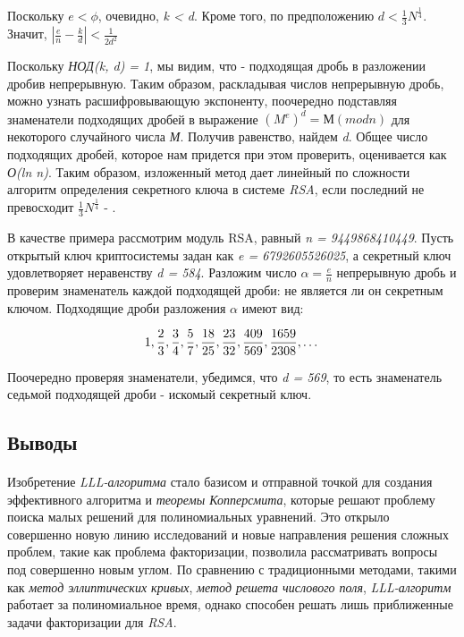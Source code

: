   Поскольку \textit{{$e < \phi$}}, очевидно, \textit{k < d}. Кроме того, по предположению \textit{{$d < \frac{1}{3} N^\frac{1}{4} $}}. Значит, 
  \textit{{$ |\frac{e}{n} - \frac{k}{d}| < \frac{1}{2 d^2} $}}
  
  Поскольку \textit{НОД(k, d) = 1}, мы видим, что - подходящая дробь в разложении дробив непрерывную. Таким образом, раскладывая числов непрерывную дробь, можно узнать 
  расшифровывающую экспоненту, поочередно подставляя знаменатели подходящих дробей в выражение \textit{{$(M^e)^d = М (mod n)$}} для некоторого случайного числа \textit{М}. 
  Получив равенство, найдем \textit{d}. Общее число подходящих дробей, которое нам придется при этом проверить, оценивается как \textit{О(ln n)}. 
  Таким образом, изложенный метод дает линейный по сложности алгоритм определения секретного ключа в системе \textit{RSA}, если последний не превосходит 
  \textit{{$\frac{1}{3} N^\frac{1}{4} $}} - \cite[Глава 9.4, страницы 174-177]{tilb06}.
  
  \begin{example}
    В качестве примера рассмотрим модуль RSA, равный \textit{n = 9449868410449}. Пусть открытый ключ криптосистемы задан как \textit{e = 6792605526025},
    а секретный ключ удовлетворяет неравенству \textit{d = 584}. Разложим число \textit{{$ \alpha = \frac{e}{n} $}} непрерывную дробь и проверим знаменатель каждой 
    подходящей дроби: не является ли он секретным ключом. Подходящие дроби разложения \textit{{$ \alpha $}} имеют вид:
    
      \begin{equation}
	\textit{{$ 1, \frac{2}{3}, \frac{3}{4}, \frac{5}{7}, \frac{18}{25}, \frac{23}{32}, \frac{409}{569}, \frac{1659}{2308}, \dots$}}
      \end{equation}

    Поочередно проверяя знаменатели, убедимся, что \textit{d = 569}, то есть знаменатель седьмой подходящей дроби - искомый секретный ключ.
  \end{example}
  
  
\subsection{Выводы}

\paragraph{} Изобретение \textit{LLL-алгоритма} стало базисом и отправной точкой для создания эффективного алгоритма и \textit{теоремы Копперсмита}, которые
  решают проблему поиска малых решений для полиномиальных уравнений. Это открыло совершенно новую линию исследований и новые направления решения
  сложных проблем, такие как проблема факторизации, позволила рассматривать вопросы под совершенно новым углом. По сравнению с
  традиционными методами, такими как \textit{метод эллиптических кривых}, \textit{метод решета числового поля}, \textit{LLL-алгоритм} работает за полиномиальное время,
  однако способен решать лишь приближенные задачи факторизации для \textit{RSA}.
  
